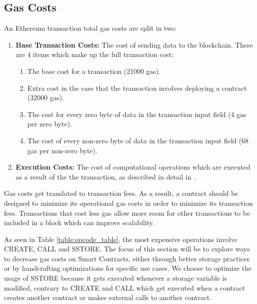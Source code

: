 \subsection{Gas Costs} \label{gas-costs}
An Ethereum transaction total gas costs are split in two: %
\begin{enumerate}
    \item \textbf{Base Transaction Costs:} The cost of sending data to the blockchain. There are 4 items which make up the full transaction cost:
        \begin{enumerate}
            \item The base cost for a transaction (21000 gas). %
            \item Extra cost in the case that the transaction involves deploying a contract (32000 gas).
            \item The cost for every zero byte of data in the transaction input field (4 gas per zero byte).
            \item The cost of every non-zero byte of data in the transaction input field (68 gas per non-zero byte).
        \end{enumerate}
    \item \textbf{Execution Costs:} The cost of computational operations which are executed as a result of the the transaction, as described in detail in \cite{ethereum, gas}.
\end{enumerate} 

Gas costs get translated to transaction fees. As a result, a contract should be designed to minimize its operational gas costs in order to minimize its transaction fees. Transactions that cost less gas allow more room for other transactions to be included in a block which can improve scalability. %




As seen in Table \ref{table:opcode_table}, the most expensive operations involve CREATE, CALL and SSTORE. The focus of this section will be to explore ways to decrease gas costs on Smart Contracts, either through better storage practices or by handcrafting optimizations for specific use cases. We choose to optimize the usage of SSTORE because it gets executed whenever a storage variable is modified, contrary to CREATE and CALL which get executed when a contract creates another contract or makes external calls to another contract.

